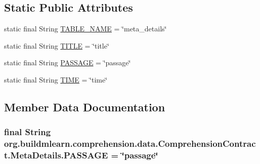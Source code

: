 \subsection*{Static Public Attributes}
\begin{DoxyCompactItemize}
\item 
static final String \hyperlink{classorg_1_1buildmlearn_1_1comprehension_1_1data_1_1ComprehensionContract_1_1MetaDetails_ab2d1d8968e538809485a307645aa820a}{T\+A\+B\+L\+E\+\_\+\+N\+A\+ME} = \char`\"{}meta\+\_\+details\char`\"{}
\item 
static final String \hyperlink{classorg_1_1buildmlearn_1_1comprehension_1_1data_1_1ComprehensionContract_1_1MetaDetails_a1ce5fa18c47b9e88954bfc8344451b1f}{T\+I\+T\+LE} = \char`\"{}title\char`\"{}
\item 
static final String \hyperlink{classorg_1_1buildmlearn_1_1comprehension_1_1data_1_1ComprehensionContract_1_1MetaDetails_a4f96769779366f2b8aa2a8c34b8b9ce5}{P\+A\+S\+S\+A\+GE} = \char`\"{}passage\char`\"{}
\item 
static final String \hyperlink{classorg_1_1buildmlearn_1_1comprehension_1_1data_1_1ComprehensionContract_1_1MetaDetails_a83e058abb4ebf3087c4487e39c579fad}{T\+I\+ME} = \char`\"{}time\char`\"{}
\end{DoxyCompactItemize}


\subsection{Member Data Documentation}
\subsubsection[{\texorpdfstring{P\+A\+S\+S\+A\+GE}{PASSAGE}}]{\setlength{\rightskip}{0pt plus 5cm}final String org.\+buildmlearn.\+comprehension.\+data.\+Comprehension\+Contract.\+Meta\+Details.\+P\+A\+S\+S\+A\+GE = \char`\"{}passage\char`\"{}\hspace{0.3cm}{\ttfamily [static]}}\hypertarget{classorg_1_1buildmlearn_1_1comprehension_1_1data_1_1ComprehensionContract_1_1MetaDetails_a4f96769779366f2b8aa2a8c34b8b9ce5}{}\label{classorg_1_1buildmlearn_1_1comprehension_1_1data_1_1ComprehensionContract_1_1MetaDetails_a4f96769779366f2b8aa2a8c34b8b9ce5}
